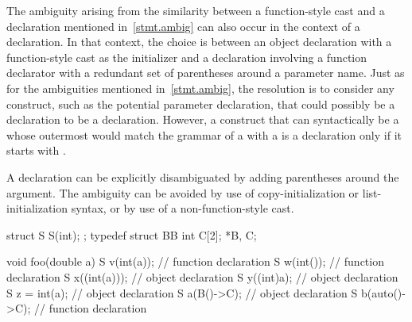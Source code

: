 \pnum
The ambiguity arising from the similarity between a function-style cast and
a declaration mentioned in~\ref{stmt.ambig} can also occur in the context of a declaration.
In that context, the choice is between
an object declaration
with a function-style cast as the initializer and
a declaration involving a function declarator
with a redundant set of parentheses around a parameter name.
Just as for the ambiguities mentioned in~\ref{stmt.ambig},
the resolution is to consider any construct,
such as the potential parameter declaration,
that could possibly be a declaration
to be a declaration.
However, a construct that can syntactically be a 
whose outermost 
would match the grammar of a 
with a 
is a declaration only if it starts with .
\begin{note}
A declaration can be explicitly disambiguated by adding parentheses
around the argument.
The ambiguity can be avoided by use of copy-initialization or
list-initialization syntax, or by use of a non-function-style cast.
\end{note}
\begin{example}
\begin{codeblock}
struct S {
  S(int);
};
typedef struct BB { int C[2]; } *B, C;

void foo(double a) {
  S v(int(a));                  // function declaration
  S w(int());                   // function declaration
  S x((int(a)));                // object declaration
  S y((int)a);                  // object declaration
  S z = int(a);                 // object declaration
  S a(B()->C);                  // object declaration
  S b(auto()->C);               // function declaration
}
\end{codeblock}
\end{example}

